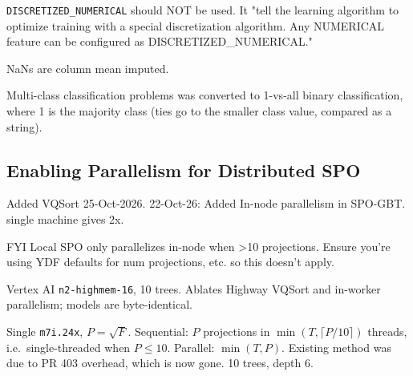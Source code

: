 \documentclass[sigconf,screen]{acmart}
\begin{document}
\texttt{DISCRETIZED\_NUMERICAL} should NOT be used. It "tell the learning algorithm to optimize training with a special discretization algorithm. Any NUMERICAL feature can be configured as DISCRETIZED\_NUMERICAL."

NaNs are column mean imputed.

Multi-class classification problems was converted to 1-vs-all binary classification, where 1 is the majority class (ties go to the smaller class value, compared as a string). %



\subsection{Enabling Parallelism for Distributed SPO}
\label{sec:in-node-parallelism}


Added VQSort 25-Oct-2026. 22-Oct-26: Added In-node parallelism in SPO-GBT. single machine gives 2x.

FYI Local SPO only parallelizes in-node when >10 projections. Ensure you're using YDF defaults for num projections, etc. so this doesn't apply.

\begin{table}[t]
\noindent\begin{minipage}[t]{0.45\textwidth}\vspace{0pt}
\captionsetup{type=table}
\centering\scriptsize\setlength{\tabcolsep}{2pt}
\caption{Benefit of VQSort and distributed in-node parallelism: tree-training time in seconds ($P{=}F$).}
\label{tab:in-node-dist-vqsort-ablation}

\par\smallskip\raggedright\footnotesize Vertex AI \texttt{n2-highmem-16}, 10 trees. Ablates Highway VQSort and in-worker parallelism; models are byte-identical.
\end{minipage}\hfill
\begin{minipage}[t]{0.53\textwidth}\vspace{0pt}
\captionsetup{type=table}
\centering\scriptsize\setlength{\tabcolsep}{2pt}
\caption{Fixing limited SPO in-node parallelism: training time in seconds of SPO-GBT with $T$ threads.}
\label{tab:in-node-dist-vqsort-vertex}

\par\smallskip\raggedright\footnotesize Single \texttt{m7i.24x}, $P=\sqrt{F}$. Sequential: $P$ projections in $\min(T,\lceil P/10\rceil)$ threads, i.e.\ single-threaded when $P\le 10$. Parallel: $\min(T,P)$. Existing method was due to PR 403 overhead, which is now gone. 10 trees, depth 6.
\end{minipage}
\end{table}
\end{document}
